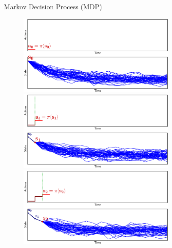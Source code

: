 \documentclass[lecture]{beamer}
\begin{document}
\begin{frame}{\normalsize Markov Decision Process (MDP)}
\begin{overlayarea}{\textwidth}{0.45\textheight}
{  \begin{overlayarea}{\textwidth}{1\textheight}
    \begin{figure}
    \newcommand{\FS}{0.7}
      \centering
        {%
          \includegraphics[width=\FS\textwidth,clip]{Codes/Basics/MDP0.eps}
        }%
        {%
          \includegraphics[width=\FS\textwidth,clip]{Codes/Basics/MDP1.eps}
        }%
        {%
          \includegraphics[width=\FS\textwidth,clip]{Codes/Basics/MDP2.eps}
        }%
        {%
}
\end{figure}
\end{overlayarea}}
\end{overlayarea}
\end{frame}
\end{document}
